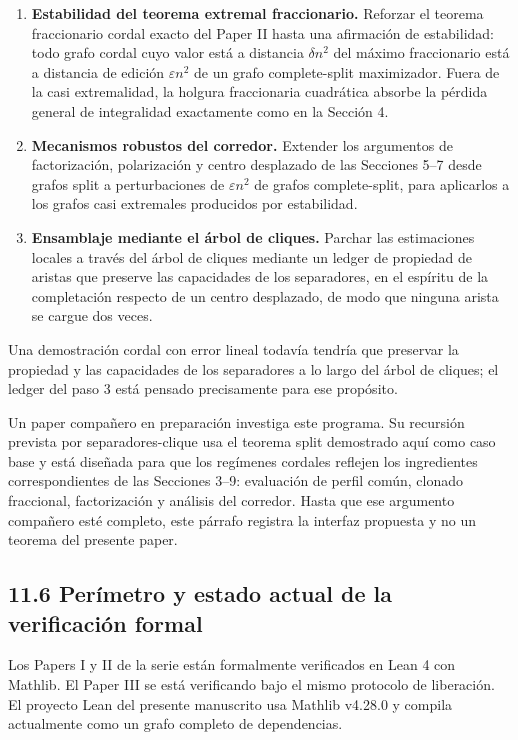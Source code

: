 \documentclass[
  11pt,
]{article}
\begin{document}
\begin{enumerate}
\def\labelenumi{\arabic{enumi}.}
\item
  \textbf{Estabilidad del teorema extremal fraccionario.} Reforzar el
  teorema fraccionario cordal exacto del Paper II hasta una afirmación
  de estabilidad: todo grafo cordal cuyo valor está a distancia
  \(\delta n^2\) del máximo fraccionario está a distancia de edición
  \(\varepsilon n^2\) de un grafo complete-split maximizador. Fuera de
  la casi extremalidad, la holgura fraccionaria cuadrática absorbe la
  pérdida general de integralidad exactamente como en la Sección 4.
\item
  \textbf{Mecanismos robustos del corredor.} Extender los argumentos de
  factorización, polarización y centro desplazado de las Secciones 5--7
  desde grafos split a perturbaciones de \(\varepsilon n^2\) de grafos
  complete-split, para aplicarlos a los grafos casi extremales
  producidos por estabilidad.
\item
  \textbf{Ensamblaje mediante el árbol de cliques.} Parchar las
  estimaciones locales a través del árbol de cliques mediante un ledger
  de propiedad de aristas que preserve las capacidades de los
  separadores, en el espíritu de la completación respecto de un centro
  desplazado, de modo que ninguna arista se cargue dos veces.
\end{enumerate}

Una demostración cordal con error lineal todavía tendría que preservar
la propiedad y las capacidades de los separadores a lo largo del árbol
de cliques; el ledger del paso 3 está pensado precisamente para ese
propósito.

Un paper compañero en preparación investiga este programa. Su recursión
prevista por separadores-clique usa el teorema split demostrado aquí
como caso base y está diseñada para que los regímenes cordales reflejen
los ingredientes correspondientes de las Secciones 3--9: evaluación de
perfil común, clonado fraccional, factorización y análisis del corredor.
Hasta que ese argumento compañero esté completo, este párrafo registra
la interfaz propuesta y no un teorema del presente paper.

\subsection{11.6 Perímetro y estado actual de la verificación
formal}\label{peruxedmetro-y-estado-actual-de-la-verificaciuxf3n-formal}

Los Papers I y II de la serie están formalmente verificados en Lean 4
con Mathlib. El Paper III se está verificando bajo el mismo protocolo de
liberación. El proyecto Lean del presente manuscrito usa Mathlib v4.28.0
y compila actualmente como un grafo completo de dependencias.
\end{document}
